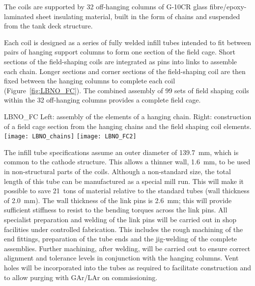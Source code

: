 The coils are supported by 32 off-hanging columns of G-10CR glass fibre/epoxy-laminated sheet insulating material, built in the form of chains and suspended from the tank deck structure. 

Each  coil is designed as a series of fully welded infill tubes intended to fit between pairs of hanging support columns to form one section of the field cage.  Short sections of the field-shaping coils are integrated as pins into links to assemble each chain.  Longer sections and  corner sections of the field-shaping coil are then fixed between the hanging columns to complete each coil (Figure~\ref{fig:LBNO_FC}). The combined assembly of 99 sets of field shaping coils within the 32 off-hanging columns provides a complete field cage.

\begin{cdrfigure}{LBNO_FC}
{\small Left: assembly of the elements of a hanging chain. Right: 
construction of a field cage section from the hanging chains and the field shaping coil elements.}
\texttt{[image: LBNO\_chains]} \hfill
\texttt{[image: LBNO\_FC2]}
\end{cdrfigure}

The infill tube specifications assume an outer diameter of 139.7~mm, which is common to the cathode structure.  This allows a thinner wall, 1.6~mm,  to be used  in non-structural parts of the  coils.  Although a non-standard size, the total length of this tube can be manufactured as a special mill run.  This will make it possible to save 21~tons of material relative to the standard tubes (wall thickness of 2.0~mm). The wall thickness of the link pins  is 2.6~mm; this will provide sufficient stiffness to resist to  the bending torques across the link pins.  All specialist preparation and welding of the link pins will be carried out in shop facilities under controlled fabrication.  This includes the rough machining of the end fittings, preparation of the tube ends and the jig-welding of the complete assemblies. Further machining, after welding, will be carried out to ensure correct alignment and tolerance levels in conjunction with the hanging columns.  Vent holes will be incorporated into the tubes as required to facilitate construction and to allow purging with GAr/LAr on commissioning.

